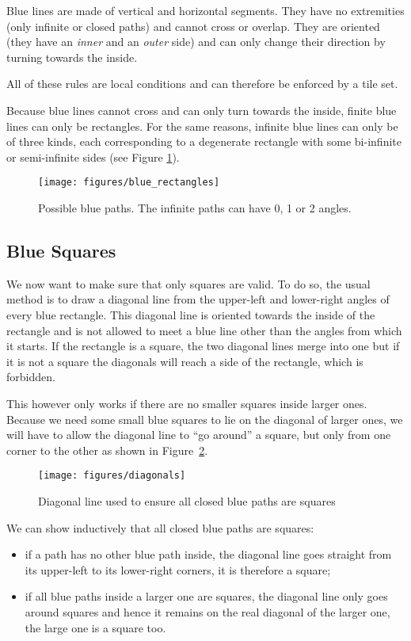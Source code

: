 \documentclass{jac}
\begin{document}
Blue lines are made of vertical and horizontal segments. They have no extremities (only infinite or closed paths) and cannot cross or overlap. They are oriented (they have an \emph{inner} and an \emph{outer} side) and can only change their direction by turning towards the inside.

All of these rules are local conditions and can therefore be enforced by a tile set.

Because blue lines cannot cross and can only turn towards the inside, finite blue lines can only be rectangles. For the same reasons, infinite blue lines can only be of three kinds, each corresponding to a degenerate rectangle with some bi-infinite or semi-infinite sides (see Figure \ref{fig:blue_rectangles}).

\begin{figure}[htbp]
	\texttt{[image: figures/blue\_rectangles]}
	\caption{Possible blue paths. The infinite paths can have 0, 1 or 2 angles.}
	\label{fig:blue_rectangles}
\end{figure}

\subsection{Blue Squares} \label{sub:blue_squares}

We now want to make sure that only squares are valid. To do so, the usual method is to draw a diagonal line from the upper-left and lower-right angles of every blue rectangle. This diagonal line is oriented towards the inside of the rectangle and is not allowed to meet a blue line other than the angles from which it starts. If the rectangle is a square, the two diagonal lines merge into one but if it is not a square the diagonals will reach a side of the rectangle, which is forbidden.

This however only works if there are no smaller squares inside larger ones. Because we need some small blue squares to lie on the diagonal of larger ones, we will have to allow the diagonal line to ``go around'' a square, but only from one corner to the other as shown in Figure~\ref{fig:diagonals}.

\begin{figure}[htbp]
	\texttt{[image: figures/diagonals]}
	\caption{Diagonal line used to ensure all closed blue paths are squares}
	\label{fig:diagonals}
\end{figure}

We can show inductively that all closed blue paths are squares:
\begin{itemize}
    \item if a path has no other blue path inside, the diagonal line goes straight from its upper-left to its lower-right corners, it is therefore a square;
    \item if all blue paths inside a larger one are squares, the diagonal line only goes around squares and hence it remains on the real diagonal of the larger one, the large one is a square too.
\end{itemize}
\end{document}

